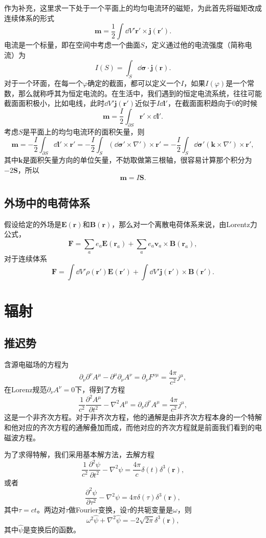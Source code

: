 \documentclass[10pt]{book}
\begin{document}
作为补充，这里求一下处于一个平面上的均匀电流环的磁矩，为此首先将磁矩改成连续体系的形式
\[
	\bm{m}=\frac{1}{2}\int \dd V' \bm{r}'\times \bm{j}(\bm{r}').
\]
电流是一个标量，即在空间中考虑一个曲面$S$，定义通过他的电流强度（简称电流）为
\[
	I(S)=\int_S \dd \bm{\sigma}\cdot \bm{j}(\bm{r}).
\]
对于一个环面，在每一个$\varphi$确定的截面，都可以定义一个$I$，如果$I(\varphi)$是一个常数，那么就称呼其为恒定电流的。在生活中，我们遇到的恒定电流系统，往往可能截面面积极小，比如电线，此时$\dd V'\bm{j}(\bm{r}')$近似于$I\dd \bm{l}'$，在截面面积趋向于0的时候
\[
	\bm{m}=\frac{I}{2}\int_{\partial S} \bm{r}'\times \dd \bm{l}'.
\]
考虑$S$是平面上的均匀电流环的面积矢量，则
\[
	\bm{m}=-\frac{I}{2}\int_{\partial S} \dd \bm{l}'\times \bm{r}'=-\frac{I}{2}\int_{S} (\dd \bm{\sigma}'\times \nabla')\times \bm{r}'=-\frac{I}{2}\int_{S} \dd \bm{\sigma}'(\bm{k}\times \nabla')\times \bm{r}',
\]
其中$\bm{k}$是面积矢量方向的单位矢量，不妨取做第三根轴，很容易计算那个积分为$-2\bm{S}$，所以
\[
	\bm{m}=I\bm{S}.
\]

\section{外场中的电荷体系}
假设给定的外场是$\bm{E}(\bm{r})$和$\bm{B}(\bm{r})$，那么对一个离散电荷体系来说，由Lorentz力公式，
\[
	\bm{F}=\sum_ae_a\bm{E}(\bm{r}_a)+\sum_ae_a\bm{v}_a\times \bm{B}(\bm{r}_a),
\]
对于连续体系
\[
	\bm{F}=\int \dd V'\rho(\bm{r}')\bm{E}(\bm{r}')+\int \dd V'\bm{j}(\bm{r}')\times \bm{B}(\bm{r}').
\]
\chapter{辐射}
\section{推迟势}
含源电磁场的方程为
\[
	\partial_\nu \partial^\nu A^\mu-\partial^\mu \partial_\nu A^\nu=\partial_\nu F^{\nu\mu}=\frac{4\pi}{c^2} j^\mu,
\]
在Lorenz规范$\partial_\nu A^\nu=0$下，得到了方程
\[
	\frac{1}{c^2}\frac{\partial^2 A^\mu}{\partial t^2}-\nabla^2 A^\mu=\partial_\nu \partial^\nu A^\mu=\frac{4\pi}{c^2} j^\mu,
\]
这是一个非齐次方程。对于非齐次方程，他的通解是由非齐次方程本身的一个特解和他对应的齐次方程的通解叠加而成，而他对应的齐次方程就是前面我们看到的电磁波方程。

为了求得特解，我们采用基本解方法，去解方程
\[
	\frac{1}{c^2}\frac{\partial^2 \psi}{\partial t^2}-\nabla^2 \psi=\frac{4\pi}{c} \delta(t)\delta^3(\bm{r}),
\]
或者
\[
	\frac{\partial^2 \psi}{\partial \tau^2}-\nabla^2 \psi=4\pi \delta(\tau)\delta^3(\bm{r}),
\]
其中$\tau=ct$。两边对$\tau$做Fourier变换，设$\tau$的共轭变量是$\omega$，则
\[
	\omega^2\hat{\psi}+\nabla^2 \hat{\psi}=-2\sqrt{2\pi}\delta^3(\bm{r}),
\]
其中$\hat{\psi}$是变换后的函数。
\end{document}
